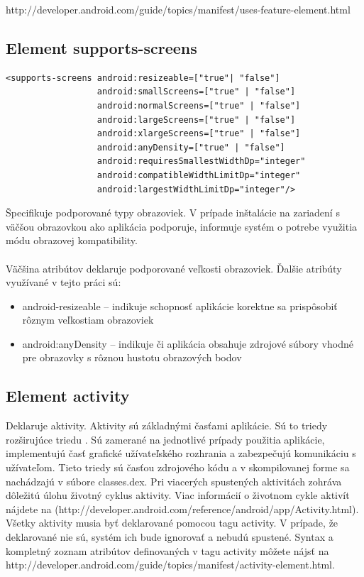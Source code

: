 http://developer.android.com/guide/topics/manifest/uses-feature-element.html
\subsection{Element supports-screens}
\lstset{language=XML}
\begin{lstlisting}
<supports-screens android:resizeable=["true"| "false"]
                  android:smallScreens=["true" | "false"]
                  android:normalScreens=["true" | "false"]
                  android:largeScreens=["true" | "false"]
                  android:xlargeScreens=["true" | "false"]
                  android:anyDensity=["true" | "false"]
                  android:requiresSmallestWidthDp="integer"
                  android:compatibleWidthLimitDp="integer"
                  android:largestWidthLimitDp="integer"/>
\end{lstlisting}
Špecifikuje podporované typy obrazoviek. V prípade inštalácie na zariadení s väčšou obrazovkou ako aplikácia podporuje, informuje systém o potrebe využitia módu obrazovej kompatibility.\\\\ Väčšina atribútov deklaruje podporované veľkosti obrazoviek. Ďalšie atribúty využívané v tejto práci sú:\\
\begin{itemize}
\item android-resizeable – indikuje schopnosť aplikácie korektne sa prispôsobiť rôznym veľkostiam obrazoviek
\item android:anyDensity – indikuje či aplikácia obsahuje zdrojové súbory vhodné pre obrazovky s rôznou hustotu obrazových bodov
\end{itemize}

\subsection{Element activity}
Deklaruje aktivity. Aktivity sú základnými časťami aplikácie. Sú to triedy rozširujúce triedu . Sú zamerané na jednotlivé prípady použitia aplikácie, implementujú časť grafické užívateľského rozhrania a zabezpečujú komunikáciu s užívateľom. Tieto triedy sú časťou zdrojového kódu a v skompilovanej forme sa nachádzajú v súbore classes.dex. Pri viacerých spustených aktivitách zohráva dôležitú úlohu životný cyklus aktivity. Viac informácií o životnom cykle aktivít nájdete na (http://developer.android.com/reference/android/app/Activity.html). Všetky aktivity musia byť deklarované pomocou tagu activity. V prípade, že deklarované nie sú, systém ich bude ignorovať a nebudú spustené. Syntax a kompletný zoznam atribútov definovaných v tagu activity môžete nájsť na http://developer.android.com/guide/topics/manifest/activity-element.html. 

